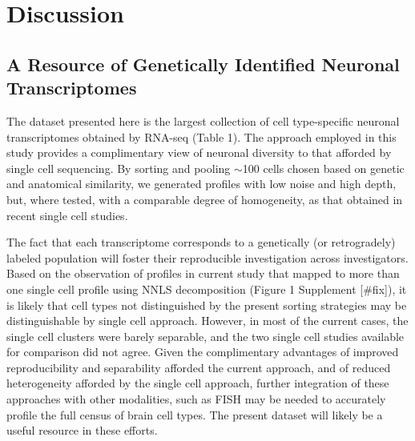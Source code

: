 
\section{Discussion}

\subsection{A Resource of Genetically Identified Neuronal Transcriptomes}

The dataset presented here is the largest collection of cell type-specific neuronal transcriptomes obtained by RNA-seq (Table 1). The approach employed in this study provides a complimentary view of neuronal diversity to that afforded by single cell sequencing. By sorting and pooling $\sim$100 cells chosen based on genetic and anatomical similarity, we generated profiles with low noise and high depth, but, where tested, with a comparable degree of homogeneity, as that obtained in recent single cell studies. 

The fact that each transcriptome corresponds to a genetically (or retrogradely) labeled population will foster their reproducible investigation across investigators. Based on the observation of profiles in current study that mapped to more than one single cell profile using NNLS decomposition (Figure 1 Supplement [#fix]), it is likely that cell types not distinguished by the present sorting strategies may be distinguishable by single cell approach. However, in most of the current cases, the single cell clusters were barely separable, and the two single cell studies available for comparison did not agree. Given the complimentary advantages of improved reproducibility and separability afforded the current approach, and of reduced heterogeneity afforded by the single cell approach, further integration of these approaches with other modalities, such as FISH \citep{Moffitt_2016} may be needed to accurately profile the full census of brain cell types. The present dataset will likely be a useful resource in these efforts. 

